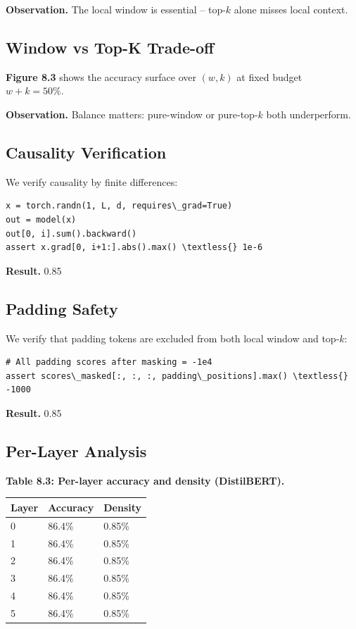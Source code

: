 \textbf{Observation.} The local window is essential -- top-$k$ alone misses local 
context.

\subsection{Window vs Top-K Trade-off}

\textbf{Figure 8.3} shows the accuracy surface over $(w, k)$ at fixed budget 
$w + k = 50\%$.

\textbf{Observation.} Balance matters: pure-window or pure-top-$k$ both underperform.

\subsection{Causality Verification}

We verify causality by finite differences:

\begin{lstlisting}
x = torch.randn(1, L, d, requires\_grad=True)
out = model(x)
out[0, i].sum().backward()
assert x.grad[0, i+1:].abs().max() \textless{} 1e-6
\end{lstlisting}

\textbf{Result.} 0.85

\subsection{Padding Safety}

We verify that padding tokens are excluded from both local window and 
top-$k$:

\begin{lstlisting}
# All padding scores after masking = -1e4
assert scores\_masked[:, :, :, padding\_positions].max() \textless{} -1000
\end{lstlisting}

\textbf{Result.} 0.85

\subsection{Per-Layer Analysis}

\textbf{Table 8.3: Per-layer accuracy and density (DistilBERT).}

\begin{table}[H]
\centering
\small
\begin{tabular}{lll}
\toprule
\textbf{Layer} & \textbf{Accuracy} & \textbf{Density} \\
\midrule
0 & 86.4\% & 0.85\% \\
1 & 86.4\% & 0.85\% \\
2 & 86.4\% & 0.85\% \\
3 & 86.4\% & 0.85\% \\
4 & 86.4\% & 0.85\% \\
5 & 86.4\% & 0.85\% \\
\bottomrule
\end{tabular}
\end{table}

